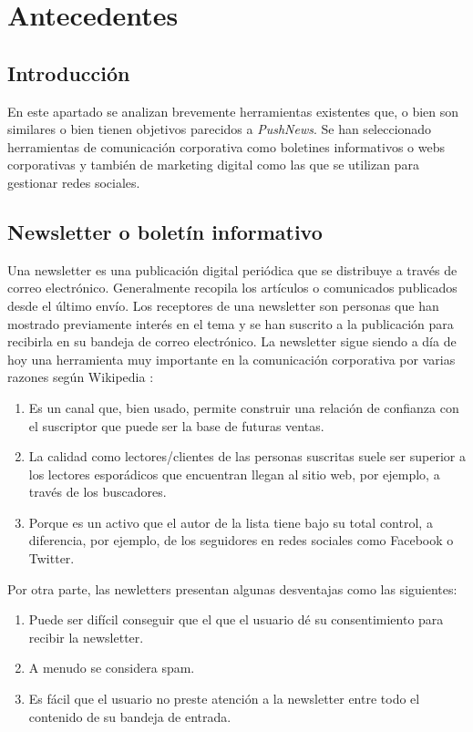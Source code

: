 \chapter{Antecedentes}

\section{Introducción}
En este apartado se analizan brevemente herramientas existentes que, o bien son similares o bien tienen objetivos parecidos a \emph{PushNews}. Se han seleccionado herramientas de comunicación corporativa como boletines informativos o webs corporativas y también de marketing digital como las que se utilizan para gestionar redes sociales.

\section{Newsletter o boletín informativo}
Una newsletter es una publicación digital periódica que se distribuye a través de correo electrónico. Generalmente recopila los artículos o comunicados publicados desde el último envío. Los receptores de una newsletter son personas que han mostrado previamente interés en el tema y se han suscrito a la publicación para recibirla en su bandeja de correo electrónico. La newsletter sigue siendo a día de hoy una herramienta muy importante en la comunicación corporativa por varias razones según Wikipedia \cite{wiki_boletininformativo}:
\begin{enumerate}
    \item Es un canal que, bien usado, permite construir una relación de confianza con el suscriptor que puede ser la base de futuras ventas.
    \item La calidad como lectores/clientes de las personas suscritas suele ser superior a los lectores esporádicos que encuentran llegan al sitio web, por ejemplo, a través de los buscadores.
    \item Porque es un activo que el autor de la lista tiene bajo su total control, a diferencia, por ejemplo, de los seguidores en redes sociales como Facebook o Twitter.
\end{enumerate}

Por otra parte, las newletters presentan algunas desventajas como las siguientes:
\begin{enumerate}
    \item Puede ser difícil conseguir que el que el usuario dé su consentimiento para recibir la newsletter.
    \item A menudo se considera spam.
    \item Es fácil que el usuario no preste atención a la newsletter entre todo el contenido de su bandeja de entrada.
\end{enumerate}

